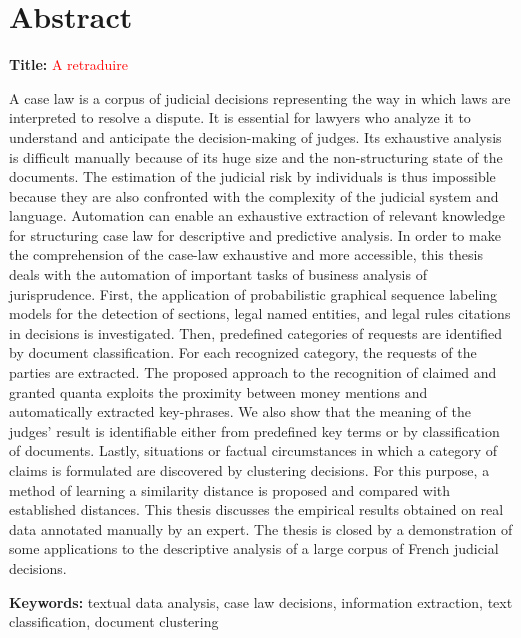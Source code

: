 \chapter*{Abstract}
\textbf{Title:} \textsc{\titleen}
\textcolor{red}{A retraduire}

A case law is a corpus of judicial decisions representing the way in which laws are interpreted to resolve a dispute. It is essential for lawyers who analyze it to understand and anticipate the decision-making of judges. Its exhaustive analysis is difficult manually because of its huge size and the non-structuring state of the documents. The estimation of the judicial risk by individuals is thus impossible because they are also confronted with the complexity of the judicial system and language. Automation can enable an exhaustive extraction of relevant knowledge for structuring case law for descriptive and predictive analysis.
In order to make the comprehension of the case-law exhaustive and more accessible, this thesis deals with the automation of important tasks of business analysis of jurisprudence. First, the application of probabilistic graphical sequence labeling models for the detection of sections, legal named entities, and legal rules citations in decisions is investigated. Then, predefined categories of requests are identified by document classification. For each recognized category, the requests of the parties are extracted. The proposed approach to the recognition of claimed and granted quanta exploits the proximity between money mentions and automatically extracted key-phrases. We also show that the meaning of the judges' result is identifiable either from predefined key terms or by classification of documents. Lastly, situations or factual circumstances in which a category of claims is formulated are discovered by clustering decisions. For this purpose, a method of learning a similarity distance is proposed and compared with established distances.
This thesis discusses the empirical results obtained on real data annotated manually by an expert. The thesis is closed by a demonstration of some applications to the descriptive analysis of a large corpus of French judicial decisions.

\textbf{Keywords:} textual data analysis, case law decisions, information extraction, text classification, document clustering